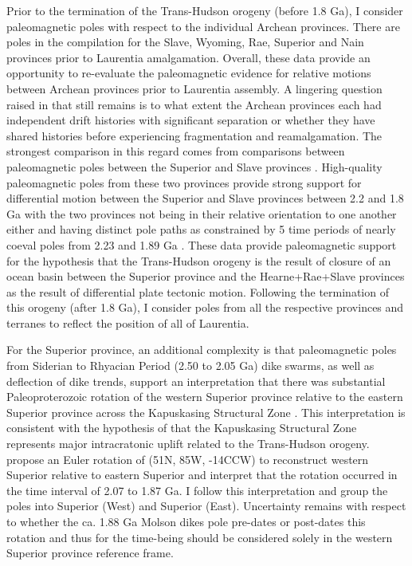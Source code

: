 \documentclass[11pt,letterpaper]{article}
\begin{document}
Prior to the termination of the Trans-Hudson orogeny (before 1.8 Ga), I consider paleomagnetic poles with respect to the individual Archean provinces. There are poles in the compilation for the Slave, Wyoming, Rae, Superior and Nain provinces prior to Laurentia amalgamation. Overall, these data provide an opportunity to re-evaluate the paleomagnetic evidence for relative motions between Archean provinces prior to Laurentia assembly. A lingering question raised in \citet{Hoffman1988a} that still remains is to what extent the Archean provinces each had independent drift histories with significant separation or whether they have shared histories before experiencing fragmentation and reamalgamation. The strongest comparison in this regard comes from comparisons between paleomagnetic poles between the Superior and Slave provinces \citep{Buchan2009a, Mitchell2014a, Buchan2016a}. High-quality paleomagnetic poles from these two provinces provide strong support for differential motion between the Superior and Slave provinces between 2.2 and 1.8 Ga with the two provinces not being in their relative orientation to one another either and having distinct pole paths as constrained by 5 time periods of nearly coeval poles from 2.23 and 1.89 Ga \citep{Buchan2016a}. These data provide paleomagnetic support for the hypothesis that the Trans-Hudson orogeny is the result of closure of an ocean basin between the Superior province and the Hearne+Rae+Slave provinces as the result of differential plate tectonic motion. Following the termination of this orogeny (after 1.8 Ga), I consider poles from all the respective provinces and terranes to reflect the position of all of Laurentia. 

For the Superior province, an additional complexity is that paleomagnetic poles from Siderian to Rhyacian Period (2.50 to 2.05 Ga) dike swarms, as well as deflection of dike trends, support an interpretation that there was substantial Paleoproterozoic rotation of the western Superior province relative to the eastern Superior province across the Kapuskasing Structural Zone \citep{Bates1991a, Evans2010a}. This interpretation is consistent with the hypothesis of \citet{Hoffman1988a} that the Kapuskasing Structural Zone represents major intracratonic uplift related to the Trans-Hudson orogeny. \cite{Evans2010a} propose an Euler rotation of (51\textdegree N, 85\textdegree W, -14\textdegree CCW) to reconstruct western Superior relative to eastern Superior and interpret that the rotation occurred in the time interval of 2.07 to 1.87 Ga.  I follow this interpretation and group the poles into Superior (West) and Superior (East).  Uncertainty remains with respect to whether the ca. 1.88 Ga Molson dikes pole pre-dates or post-dates this rotation and thus for the time-being should be considered solely in the western Superior province reference frame. 
\end{document}
